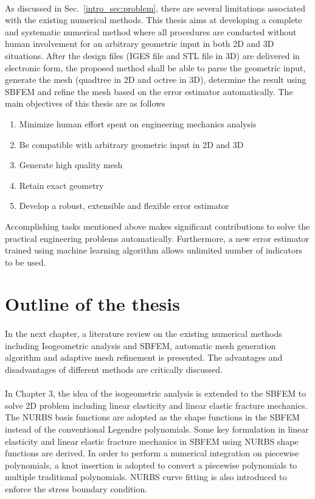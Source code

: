 \paragraph{}
As discussed in Sec.~\ref{intro_sec:problem}, there are several limitations associated with the existing numerical methods.
This thesis aims at developing a complete and systematic numerical method where all procedures are conducted without human involvement for an arbitrary geometric input in both 2D and 3D situations.
After the design files (IGES file and STL file in 3D) are delivered in electronic form, the proposed method shall be able to parse the geometric input, generate the mesh (quadtree in 2D and octree in 3D), determine the result using SBFEM and refine the mesh based on the error estimator automatically.
The main objectives of this thesis are as follows
\begin{enumerate}
    \item Minimize human effort spent on engineering mechanics analysis
    \item Be compatible with arbitrary geometric input in 2D and 3D
    \item Generate high quality mesh
    \item Retain exact geometry
    \item Develop a robust, extensible and flexible error estimator
\end{enumerate}
Accomplishing tasks mentioned above makes significant contributions to solve the practical engineering problems automatically.
Furthermore, a new error estimator trained using machine learning algorithm allows unlimited number of indicators to be used.

\section{Outline of the thesis}
\paragraph{}
In the next chapter, a literature review on the existing numerical methods including Isogeometric analysis and SBFEM, automatic mesh generation algorithm and adaptive mesh refinement is presented.
The advantages and disadvantages of different methods are critically discussed.

\paragraph{}
In Chapter 3, the idea of the isogeometric analysis is extended to the SBFEM to solve 2D problem including linear elasticity and linear elastic fracture mechanics.
The NURBS basis functions are adopted as the shape functions in the SBFEM instead of the conventional Legendre polynomials.
Some key formulation in linear elasticity and linear elastic fracture mechanics in SBFEM using NURBS shape functions are derived.
In order to perform a numerical integration on piecewise polynomials, a knot insertion is adopted to convert a piecewise polynomials to multiple traditional polynomials.
NURBS curve fitting is also introduced to enforce the stress boundary condition.

